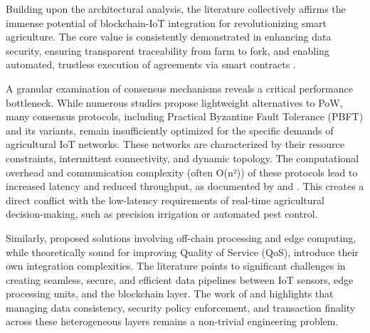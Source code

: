 \documentclass[12pt,onecolumn]{IEEEtran} %
\begin{document}
Building upon the architectural analysis, the literature collectively affirms the immense potential of blockchain-IoT integration for revolutionizing smart agriculture. The core value is consistently demonstrated in enhancing data security, ensuring transparent traceability from farm to fork, and enabling automated, trustless execution of agreements via smart contracts \cite{aliyu2023blockchainbasedsmartfarm, ellahi2023blockchainbasedframeworksfor}.

A granular examination of consensus mechanisms reveals a critical performance bottleneck. While numerous studies propose lightweight alternatives to PoW, many consensus protocols, including Practical Byzantine Fault Tolerance (PBFT) and its variants, remain insufficiently optimized for the specific demands of agricultural IoT networks. These networks are characterized by their resource constraints, intermittent connectivity, and dynamic topology. The computational overhead and communication complexity (often O(n²)) of these protocols lead to increased latency and reduced throughput, as documented by \cite{ali2022blockchainenabledarchitecture} and \cite{morais2023surveyonintegration}. This creates a direct conflict with the low-latency requirements of real-time agricultural decision-making, such as precision irrigation or automated pest control.

Similarly, proposed solutions involving off-chain processing and edge computing, while theoretically sound for improving Quality of Service (QoS), introduce their own integration complexities. The literature points to significant challenges in creating seamless, secure, and efficient data pipelines between IoT sensors, edge processing units, and the blockchain layer. The work of \cite{khan2022ablockchainand} and \cite{sizan2505asecuredtriad} highlights that managing data consistency, security policy enforcement, and transaction finality across these heterogeneous layers remains a non-trivial engineering problem.
\end{document}
